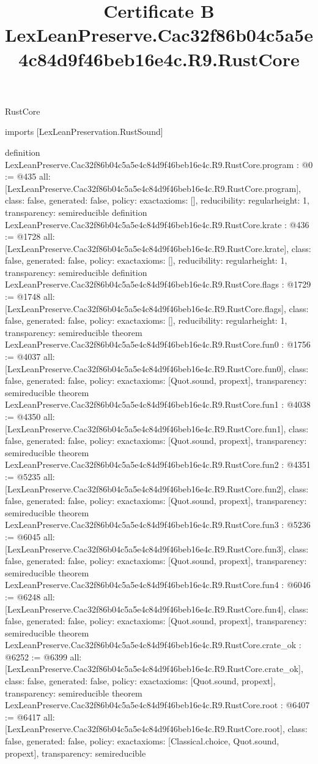 \begin{lexlean}{RustCore}
\title{Certificate B LexLeanPreserve.Cac32f86b04c5a5e4c84d9f46beb16e4c.R9.RustCore}
\begin{coremodule}
imports [LexLeanPreservation.RustSound]

definition LexLeanPreserve.Cac32f86b04c5a5e4c84d9f46beb16e4c.R9.RustCore.program : @0 := @435 {
  all: [LexLeanPreserve.Cac32f86b04c5a5e4c84d9f46beb16e4c.R9.RustCore.program],
  class: false,
  generated: false,
  policy: exact{axioms: []},
  reducibility: regular{height: 1},
  transparency: semireducible
}
definition LexLeanPreserve.Cac32f86b04c5a5e4c84d9f46beb16e4c.R9.RustCore.krate : @436 := @1728 {
  all: [LexLeanPreserve.Cac32f86b04c5a5e4c84d9f46beb16e4c.R9.RustCore.krate],
  class: false,
  generated: false,
  policy: exact{axioms: []},
  reducibility: regular{height: 1},
  transparency: semireducible
}
definition LexLeanPreserve.Cac32f86b04c5a5e4c84d9f46beb16e4c.R9.RustCore.flags : @1729 := @1748 {
  all: [LexLeanPreserve.Cac32f86b04c5a5e4c84d9f46beb16e4c.R9.RustCore.flags],
  class: false,
  generated: false,
  policy: exact{axioms: []},
  reducibility: regular{height: 1},
  transparency: semireducible
}
theorem LexLeanPreserve.Cac32f86b04c5a5e4c84d9f46beb16e4c.R9.RustCore.fun0 : @1756 := @4037 {
  all: [LexLeanPreserve.Cac32f86b04c5a5e4c84d9f46beb16e4c.R9.RustCore.fun0],
  class: false,
  generated: false,
  policy: exact{axioms: [Quot.sound, propext]},
  transparency: semireducible
}
theorem LexLeanPreserve.Cac32f86b04c5a5e4c84d9f46beb16e4c.R9.RustCore.fun1 : @4038 := @4350 {
  all: [LexLeanPreserve.Cac32f86b04c5a5e4c84d9f46beb16e4c.R9.RustCore.fun1],
  class: false,
  generated: false,
  policy: exact{axioms: [Quot.sound, propext]},
  transparency: semireducible
}
theorem LexLeanPreserve.Cac32f86b04c5a5e4c84d9f46beb16e4c.R9.RustCore.fun2 : @4351 := @5235 {
  all: [LexLeanPreserve.Cac32f86b04c5a5e4c84d9f46beb16e4c.R9.RustCore.fun2],
  class: false,
  generated: false,
  policy: exact{axioms: [Quot.sound, propext]},
  transparency: semireducible
}
theorem LexLeanPreserve.Cac32f86b04c5a5e4c84d9f46beb16e4c.R9.RustCore.fun3 : @5236 := @6045 {
  all: [LexLeanPreserve.Cac32f86b04c5a5e4c84d9f46beb16e4c.R9.RustCore.fun3],
  class: false,
  generated: false,
  policy: exact{axioms: [Quot.sound, propext]},
  transparency: semireducible
}
theorem LexLeanPreserve.Cac32f86b04c5a5e4c84d9f46beb16e4c.R9.RustCore.fun4 : @6046 := @6248 {
  all: [LexLeanPreserve.Cac32f86b04c5a5e4c84d9f46beb16e4c.R9.RustCore.fun4],
  class: false,
  generated: false,
  policy: exact{axioms: [Quot.sound, propext]},
  transparency: semireducible
}
theorem LexLeanPreserve.Cac32f86b04c5a5e4c84d9f46beb16e4c.R9.RustCore.crate_ok : @6252 := @6399 {
  all: [LexLeanPreserve.Cac32f86b04c5a5e4c84d9f46beb16e4c.R9.RustCore.crate_ok],
  class: false,
  generated: false,
  policy: exact{axioms: [Quot.sound, propext]},
  transparency: semireducible
}
theorem LexLeanPreserve.Cac32f86b04c5a5e4c84d9f46beb16e4c.R9.RustCore.root : @6407 := @6417 {
  all: [LexLeanPreserve.Cac32f86b04c5a5e4c84d9f46beb16e4c.R9.RustCore.root],
  class: false,
  generated: false,
  policy: exact{axioms: [Classical.choice, Quot.sound, propext]},
  transparency: semireducible
}


\end{coremodule}
\end{lexlean}
